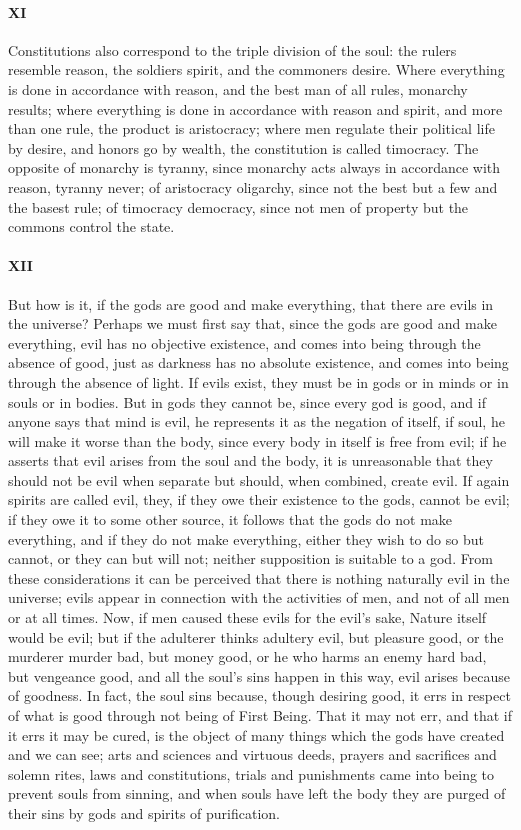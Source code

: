 \documentclass[12pt]{article}
\begin{document}
\paragraph{XI} Constitutions also correspond to the triple division of the
soul: the rulers resemble reason, the soldiers spirit, and the commoners
desire. Where everything is done in accordance with reason, and the best man of
all rules, monarchy results; where everything is done in accordance with reason
and spirit, and more than one rule, the product is aristocracy; where men
regulate their political life by desire, and honors go by wealth, the
constitution is called timocracy. The opposite of monarchy is tyranny, since
monarchy acts always in accordance with reason, tyranny never; of aristocracy
oligarchy, since not the best but a few and the basest rule; of timocracy
democracy, since not men of property but the commons control the state.

\paragraph{XII} But how is it, if the gods are good and make everything, that
there are evils in the universe? Perhaps we must first say that, since the gods
are good and make everything, evil has no objective existence, and comes into
being through the absence of good, just as darkness has no absolute existence,
and comes into being through the absence of light. If evils exist, they must
be in gods or in minds or in souls or in bodies. But in gods they cannot be,
since every god is good, and if anyone says that mind is evil, he represents it
as the negation of itself, if soul, he will make it worse than the body, since
every body in itself is free from evil; if he asserts that evil arises from the
soul and the body, it is unreasonable that they should not be evil when
separate but should, when combined, create evil. If again spirits are called
evil, they, if they owe their existence to the gods, cannot be evil; if they
owe it to some other source, it follows that the gods do not make everything,
and if they do not make everything, either they wish to do so but cannot, or
they can but will not; neither supposition is suitable to a god. From these
considerations it can be perceived that there is nothing naturally evil in the
universe; evils appear in connection with the activities of men, and not of all
men or at all times. Now, if men caused these evils for the evil's sake, Nature
itself would be evil; but if the adulterer thinks adultery evil, but pleasure
good, or the murderer murder bad, but money good, or he who harms an enemy hard
bad, but vengeance good, and all the soul's sins happen in this way, evil
arises because of goodness. In fact, the soul sins because, though desiring
good, it errs in respect of what is good through not being of First Being.
That it may not err, and that if it errs it may be cured, is the object of many
things which the gods have created and we can see; arts and sciences and
virtuous deeds, prayers and sacrifices and solemn rites, laws and
constitutions, trials and punishments came into being to prevent souls from
sinning, and when souls have left the body they are purged of their sins by
gods and spirits of purification.
\end{document}
